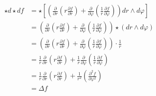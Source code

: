 \documentclass{article}
\begin{document}
\begin{align*}
	\star d \star df &= \star \left[\left(\frac{\partial}{\partial r}\left(r \frac{\partial f}{\partial r}\right) + \frac{\partial}{\partial \varphi}\left(\frac{1}{r} \frac{\partial f}{\partial \varphi}\right)\right) dr \wedge d\varphi\right]\\
	&= \left(\frac{\partial}{\partial r}\left(r \frac{\partial f}{\partial r}\right) + \frac{\partial}{\partial \varphi}\left(\frac{1}{r} \frac{\partial f}{\partial \varphi}\right)\right) \star (dr \wedge d\varphi)\\
	&= \left(\frac{\partial}{\partial r}\left(r \frac{\partial f}{\partial r}\right) + \frac{\partial}{\partial \varphi}\left(\frac{1}{r} \frac{\partial f}{\partial \varphi}\right)\right) \cdot \frac{1}{r}\\
	&= \frac{1}{r} \frac{\partial}{\partial r}\left(r \frac{\partial f}{\partial r}\right) + \frac{1}{r} \frac{\partial}{\partial \varphi}\left( \frac{1}{r}\frac{\partial f}{\partial \varphi}\right)\\
	&= \frac{1}{r} \frac{\partial}{\partial r}\left(r \frac{\partial f}{\partial r}\right) + \frac{1}{r^2} \left( \frac{\partial^2 f}{\partial \varphi^2}\right)\\
	&= \Delta f
\end{align*}
\end{document}
